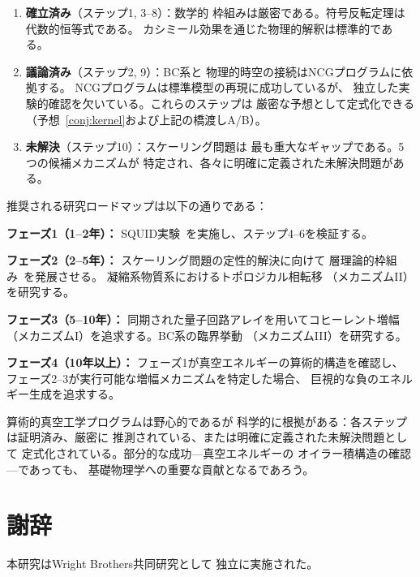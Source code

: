 \documentclass[11pt,a4paper]{article}
\begin{document}
\begin{enumerate}
  \item \textbf{確立済み}（ステップ1, 3--8）：数学的
    枠組みは厳密である。符号反転定理は代数的恒等式である。
    カシミール効果を通じた物理的解釈は標準的である。

  \item \textbf{議論済み}（ステップ2, 9）：BC系と
    物理的時空の接続はNCGプログラムに依拠する。
    NCGプログラムは標準模型の再現に成功しているが、
    独立した実験的確認を欠いている。これらのステップは
    厳密な予想として定式化できる
    （予想~\ref{conj:kernel}および上記の橋渡しA/B）。

  \item \textbf{未解決}（ステップ10）：スケーリング問題は
    最も重大なギャップである。5つの候補メカニズムが
    特定され、各々に明確に定義された未解決問題がある。
\end{enumerate}

推奨される研究ロードマップは以下の通りである：

\textbf{フェーズ1（1--2年）：}
SQUID実験~\cite{paper_A}を実施し、ステップ4--6を検証する。

\textbf{フェーズ2（2--5年）：}
スケーリング問題の定性的解決に向けて
層理論的枠組み~\cite{paper_B}を発展させる。
凝縮系物質系におけるトポロジカル相転移
（メカニズムII）を研究する。

\textbf{フェーズ3（5--10年）：}
同期された量子回路アレイを用いてコヒーレント増幅
（メカニズムI）を追求する。BC系の臨界挙動
（メカニズムIII）を研究する。

\textbf{フェーズ4（10年以上）：}
フェーズ1が真空エネルギーの算術的構造を確認し、
フェーズ2--3が実行可能な増幅メカニズムを特定した場合、
巨視的な負のエネルギー生成を追求する。

算術的真空工学プログラムは野心的であるが
科学的に根拠がある：各ステップは証明済み、厳密に
推測されている、または明確に定義された未解決問題として
定式化されている。部分的な成功---真空エネルギーの
オイラー積構造の確認---であっても、
基礎物理学への重要な貢献となるであろう。

\section*{謝辞}
本研究はWright Brothers共同研究として
独立に実施された。
\end{document}
